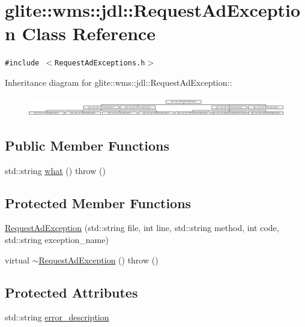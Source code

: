 \hypertarget{classglite_1_1wms_1_1jdl_1_1RequestAdException}{
\section{glite::wms::jdl::Request\-Ad\-Exception Class Reference}
\label{classglite_1_1wms_1_1jdl_1_1RequestAdException}
}
{\tt \#include $<$Request\-Ad\-Exceptions.h$>$}

Inheritance diagram for glite::wms::jdl::Request\-Ad\-Exception::\begin{figure}[H]
\begin{center}
\leavevmode
\includegraphics[height=0.854093cm]{classglite_1_1wms_1_1jdl_1_1RequestAdException}
\end{center}
\end{figure}
\subsection*{Public Member Functions}
\begin{CompactItemize}
\item 
std::string \hyperlink{classglite_1_1wms_1_1jdl_1_1RequestAdException_a0}{what} ()  throw ()
\end{CompactItemize}
\subsection*{Protected Member Functions}
\begin{CompactItemize}
\item 
\hyperlink{classglite_1_1wms_1_1jdl_1_1RequestAdException_b0}{Request\-Ad\-Exception} (std::string file, int line, std::string method, int code, std::string exception\_\-name)
\item 
virtual \hyperlink{classglite_1_1wms_1_1jdl_1_1RequestAdException_b1}{$\sim$Request\-Ad\-Exception} ()  throw ()
\end{CompactItemize}
\subsection*{Protected Attributes}
\begin{CompactItemize}
\item 
std::string \hyperlink{classglite_1_1wms_1_1jdl_1_1RequestAdException_p0}{error\_\-description}
\end{CompactItemize}


